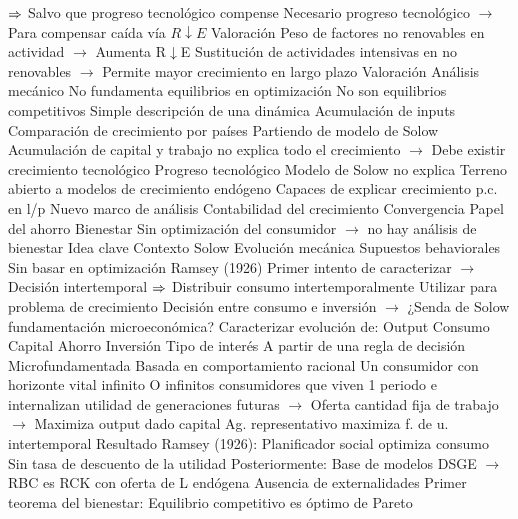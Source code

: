 \documentclass{nuevotema}
\begin{document}
\begin{esquemal}
				\4[] $\Rightarrow$ Salvo que progreso tecnológico compense
				\4[] Necesario progreso tecnológico
				\4[] $\to$ Para compensar caída vía $R\downarrow E$
				\4 Valoración
				\4[] Peso de factores no renovables en actividad
				\4[] $\to$ Aumenta R$\downarrow$E
				\4[] Sustitución de actividades intensivas en no renovables
				\4[] $\to$ Permite mayor crecimiento en largo plazo
		\2 Valoración
			\3 Análisis mecánico
				\4 No fundamenta equilibrios en optimización
				\4 No son equilibrios competitivos
				\4 Simple descripción de una dinámica
			\3 Acumulación de inputs
				\4 Comparación de crecimiento por países
				\4[] Partiendo de modelo de Solow
				\4[] Acumulación de capital y trabajo no explica todo el crecimiento
				\4[] $\to$ Debe existir crecimiento tecnológico
			\3 Progreso tecnológico
				\4 Modelo de Solow no explica
				\4 Terreno abierto a modelos de crecimiento endógeno
				\4[] Capaces de explicar crecimiento p.c. en l/p
			\3 Nuevo marco de análisis
				\4 Contabilidad del crecimiento
				\4 Convergencia
				\4 Papel del ahorro
			\3 Bienestar
				\4 Sin optimización del consumidor
				\4[] $\to$ no hay análisis de bienestar
	\1 
		\2 Idea clave
			\3 Contexto
				\4 Solow
				\4[] Evolución mecánica
				\4[] Supuestos behaviorales
				\4[] Sin basar en optimización
				\4 Ramsey (1926)
				\4[] Primer intento de caracterizar
				\4[] $\to$ Decisión intertemporal
				\4[] $\Rightarrow$ Distribuir consumo intertemporalmente
				\4 Utilizar para problema de crecimiento
				\4[] Decisión entre consumo e inversión
				\4[] $\to$ ¿Senda de Solow fundamentación microeconómica?
			\3 Caracterizar evolución de:
				\4 Output
				\4 Consumo
				\4 Capital
				\4[$\to$] Ahorro
				\4[$\to$] Inversión
				\4[$\to$] Tipo de interés
			\3 A partir de una regla de decisión
				\4 Microfundamentada
				\4 Basada en comportamiento racional
				\4[] Un consumidor con horizonte vital infinito
				\4[] O infinitos consumidores que viven 1 periodo
				\4[] e internalizan utilidad de generaciones futuras
				\4[] $\to$ Oferta cantidad fija de trabajo
				\4[] $\to$ Maximiza output dado capital
				\4[$\Rightarrow$] Ag. representativo maximiza f. de u. intertemporal
			\3 Resultado
				\4 Ramsey (1926):
				\4[] Planificador social optimiza consumo
				\4[] Sin tasa de descuento de la utilidad
				\4 Posteriormente:
				\4[] Base de modelos DSGE
				\4[] $\to$ RBC es RCK con oferta de L endógena
				\4 Ausencia de externalidades
				\4[] Primer teorema del bienestar:
				\4[] Equilibrio competitivo es óptimo de Pareto

\end{esquemal}
\end{document}
